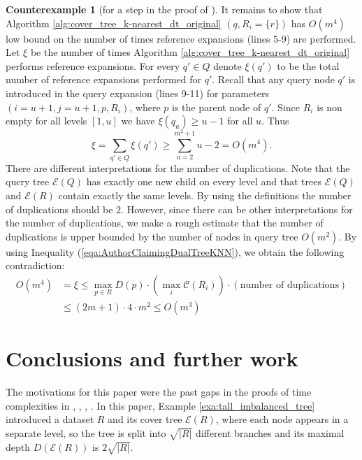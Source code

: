\documentclass{vgtc}                          %
\numberwithin{algocf}{section}
\theoremstyle{definition}
\theoremstyle{definition}
\theoremstyle{definition}
\newtheorem{cexa}[algocf]{Counterexample}
\theoremstyle{plain}
\newcommand{\C}{\mathcal{C}}
\newcommand{\T}{\mathcal{E}}
\begin{document}
\begin{cexa}[for a step in the proof of {\cite[Theorem~3.1]{ram2009linear}} ]
	\medskip
	\noindent
	It remains to show that Algorithm \ref{alg:cover_tree_k-nearest_dt_original} $(q, R_i = \{r\})$ has $O(m^4)$ low bound on the number of times reference expansions (lines 5-9) are performed.
	Let $\xi$ be the number of times Algorithm \ref{alg:cover_tree_k-nearest_dt_original} performs 
	reference expansions.  For every $q' \in Q$ denote $\xi(q')$ to be the total number of reference expansions performed for $q'$. Recall that any query node $q'$ is introduced in the query expansion (lines 9-11) for parameters $(i = u+1, j = u+1, p, R_i)$, where $p$ is the parent node of $q'$. Since $R_i$ is non empty for all levels $[1,u]$ we have $\xi(q_u) \geq u - 1$ for all $u$. Thus 
	$$\xi = \sum_{q' \in Q} \xi(q') \geq \sum^{m^2+1}_{u = 2} u-2 = O(m^4).$$
	There are different interpretations for the number of duplications. Note that the query tree $\T(Q)$ has exactly one new child on every level and that trees $\T(Q)$ and $\T(R)$ contain exactly the same levels. By using the definitions the number of duplications should be $2$. However, since there can be other interpretations for the number of duplications, we make a rough estimate that the number of duplications is upper bounded by the number of nodes in query tree $O(m^2)$. By using Inequality (\ref{eqa:AuthorClaimingDualTreeKNN}), we obtain the following contradiction: \begin{align*}
	  O(m^4) &= \xi \leq  \max_{p \in R}D(p) \cdot (\max_i \C(R_i)) \cdot (\text{number of duplications}) \\
	  &\leq (2m+1) \cdot 4 \cdot m^2 \leq O(m^3)
	\end{align*}
\end{cexa}


\section{Conclusions and further work}

The motivations for this paper were the past gaps in the proofs of time complexities in \cite[Theorem~5]{beygelzimer2006cover}, \cite[Theorem~6]{beygelzimer2006cover}, \cite[Theorem~3.1]{ram2009linear}, \cite[Theorem~5.1]{march2010fast}. 
In this paper, Example \ref{exa:tall_imbalanced_tree} introduced a dataset $R$ and its cover tree $\T(R)$, where each node appears in a separate level, so the tree 
is split into $\sqrt{|R|}$ different branches and its maximal depth $D(\T(R))$ is $2\sqrt{|R|}$.
\medskip
\end{document}
